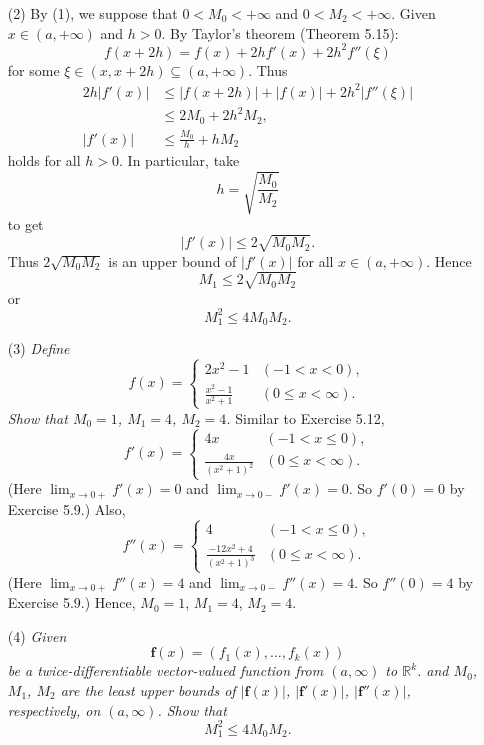 \documentclass{article}
\begin{document}
\begin{enumerate}
\item[(2)]
By (1), we suppose that $0 < M_0 < +\infty$ and $0 < M_2 < +\infty$.
Given $x \in (a,+\infty)$ and $h>0$.
By Taylor's theorem (Theorem 5.15):
\[
  f(x+2h) = f(x) + 2h f'(x) + 2 h^2 f''(\xi)
\]
for some $\xi \in (x,x+2h) \subseteq (a,+\infty)$.
Thus
\begin{align*}
  2h|f'(x)|
  &\leq |f(x+2h)| + |f(x)| + 2 h^2 |f''(\xi)| \\
  &\leq 2 M_0 + 2 h^2 M_2, \\
  |f'(x)|
  &\leq \frac{M_0}{h} + h M_2
\end{align*}
holds for all $h > 0$.
In particular, take
\[
  h = \sqrt{\frac{M_0}{M_2}}
\]
to get
\[
  |f'(x)| \leq 2 \sqrt{M_0 M_2}.
\]
Thus $2 \sqrt{M_0 M_2}$ is an upper bound of $|f'(x)|$ for all $x \in (a,+\infty)$.
Hence
\[
  M_1 \leq 2 \sqrt{M_0 M_2}
\]
or
\[
  M_1^2 \leq 4 M_0 M_2.
\]

\item[(3)]
\emph{Define
\begin{equation*}
  f(x) =
    \begin{cases}
      2x^2 - 1            & (-1 < x < 0), \\
      \frac{x^2-1}{x^2+1} & (0 \leq x < \infty).
    \end{cases}
\end{equation*}
Show that $M_0 = 1$, $M_1 = 4$, $M_2 = 4$.}
Similar to Exercise 5.12,
\begin{equation*}
  f'(x) =
    \begin{cases}
      4x                   & (-1 < x \leq 0), \\
      \frac{4x}{(x^2+1)^2} & (0 \leq x < \infty).
    \end{cases}
\end{equation*}
(Here $\lim_{x \to 0+} f'(x) = 0$ and $\lim_{x \to 0-} f'(x) = 0$.
So $f'(0) = 0$ by Exercise 5.9.)
Also,
\begin{equation*}
  f''(x) =
    \begin{cases}
      4                          & (-1 < x \leq 0), \\
      \frac{-12x^2+4}{(x^2+1)^3} & (0 \leq x < \infty).
    \end{cases}
\end{equation*}
(Here $\lim_{x \to 0+} f''(x) = 4$ and $\lim_{x \to 0-} f''(x) = 4$.
So $f''(0) = 4$ by Exercise 5.9.)
Hence, $M_0 = 1$, $M_1 = 4$, $M_2 = 4$.

\item[(4)]
\emph{Given
\[
  \mathbf{f}(x) = (f_1(x), \ldots, f_k(x))
\]
be a twice-differentiable vector-valued function from $(a,\infty)$ to $\mathbb{R}^k$.
and $M_0$, $M_1$, $M_2$ are the least upper bounds of
$|\mathbf{f}(x)|$, $|\mathbf{f}'(x)|$, $|\mathbf{f}''(x)|$, respectively, on $(a,\infty)$.
Show that
\[
  M_1^2 \leq 4 M_0 M_2.
\]}


\end{enumerate}
\end{document}
